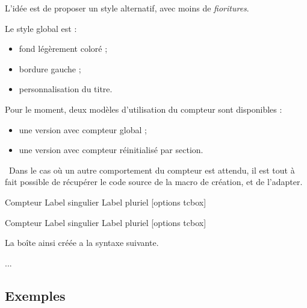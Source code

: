 \documentclass[french,11pt,a4paper]{article}
\begin{document}
L'idée est de proposer un style alternatif, avec moins de \textit{fioritures}.

Le style global est :

\begin{itemize}
	\item fond légèrement coloré ;
	\item bordure gauche ;
	\item personnalisation du titre.
\end{itemize}

Pour le moment, deux modèles d'utilisation du compteur sont disponibles :

\begin{itemize}
	\item une version avec compteur global ;
	\item une version avec compteur réinitialisé par section.
\end{itemize}

{\footnotesize \faBomb}~Dans le cas où un autre comportement du compteur est attendu, il est tout à fait possible de récupérer le code source de la macro de création, et de l'adapter.

\begin{codehigh}[language=latex/latex2,style/main=cyan!10,style/code=cyan!10]
%
  {Compteur}%
  {Label singulier}
  {Label pluriel}
  [options tcbox]

%
  {Compteur}%
  {Label singulier}
  {Label pluriel}
  [options tcbox]
\end{codehigh}

La boîte ainsi créée a la syntaxe suivante.

\begin{codehigh}[language=latex/latex2,style/main=cyan!10,style/code=cyan!10]
\begin{monenvt}[clés]
...
\end{monenvt}

\end{codehigh}

\subsection{Exemples}
\end{document}
